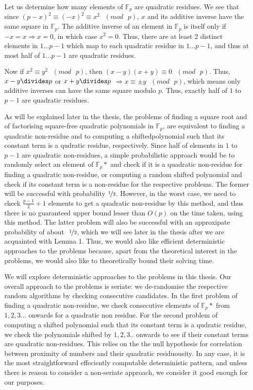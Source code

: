 \documentclass{report}
\begin{document}
Let us determine how many elements of $\mathbb{F}_p$ are quadratic residues. We see that since $(p-x)^2\equiv(-x)^2\equiv x^2\textrm{  }(mod\textrm{ }p)$, $x$ and its additive inverse have the same square in $\mathbb{F}_p$. The additive inverse of an element in $\mathbb{F}_p$ is itself only if $-x=x \Rightarrow x=0$, in which case $x^2=0$. Thus, there are at least 2 distinct elements in $1\ldots p-1$ which map to each quadratic residue in $1\ldots p-1$, and thus at most half of $1\ldots p-1$ are quadratic residues.

Now if $x^2\equiv y^2 \textrm{ }(mod\textrm{ } p)$, then $(x-y)(x+y)\equiv 0\textrm{ }(mod\textrm{ } p)$. Thus, $x-y\divides p$ or $x+y\divides p$ $\Rightarrow x\equiv \pm y \textrm{ } (mod\textrm{ } p)$, which means only additive inverses can have the same square modulo $p$. Thus, exactly half of $1$ to $p-1$ are quadratic residues.

As will be explained later in the thesis, the problems of finding a square root and of factorising square-free quadratic polynomials in $\mathbb{F}_p$, are equivalent to finding a quadratic non-residue and to computing a shifted\footnotemark polynomial such that its constant term is a qudratic residue, respectively. Since half of elements in $1$ to $p-1$ are quadratic non-residues, a simple probabilistic approach would be to randomly select an element of $\mathbb{F}_p*$ and check if it is a quadratic non-residue for finding a quadratic non-residue, or computing a random shifted polynomial and check if its constant term is a non-residue for the respective problems. The former will be successful with probability $\nicefrac{1}{2}$. However, in the worst case, we need to check $\frac{p-1}{2}+1$ elements to get a quadratic non-residue by this method, and thus there is no guaranteed upper bound lesser than $O(p)$ on the time taken, using this method. The latter problem will also be successful with an approxipate probability of about $~\nicefrac{1}{2}$, which we will see later in the thesis after we are acquainted with Lemma 1. Thus, we would also like efficient deterministic approaches to the problems because, apart from the theoretical interest in the problems, we would also like to theoretically bound their solving time.

We will explore deterministic approaches to the problems in this thesis. Our overall approach to the problems is seriate: we de-randomise the respective random algorithms by checking consecutive candidates. In the first problem of finding a quadratic non-residue, we check consecutive elements of $\mathbb{F}_p*$ from $1,2,3...$ onwards for a quadratic non residue. For the second problem of computing a shifted polynomial such that its constant term is a qudratic residue, we check the polynomials shifted by $1,2,3..$ onwards to see if their constant terms are quadratic non-residues. This relies on the the null hypothesis for correlation between proximity of numbers and their quadratic residuousity. In any case, it is the most straightforward effeciently computable deterministic pattern, and unless there is reason to consider a non-seriate approach, we consider it good enough for our purposes.
\end{document}
